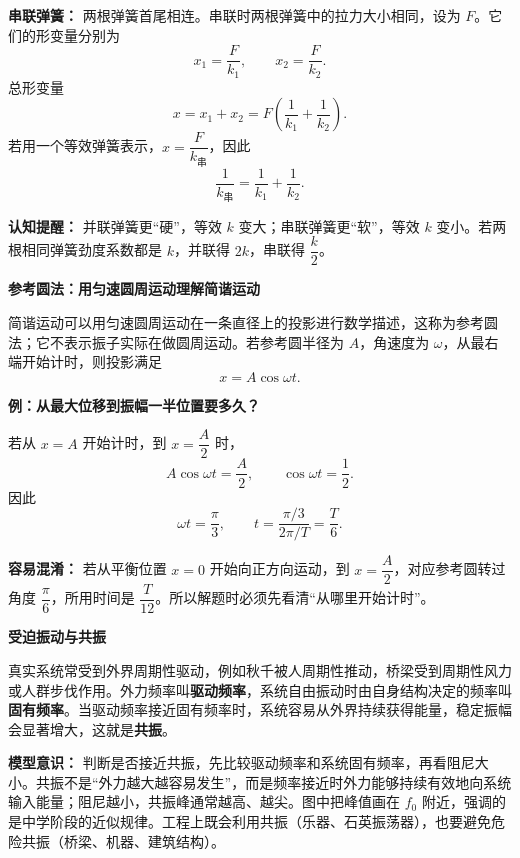 \begin{competitionbox}
\textbf{串联弹簧：} 两根弹簧首尾相连。串联时两根弹簧中的拉力大小相同，设为 $F$。它们的形变量分别为
\[
x_1=\frac{F}{k_1},\qquad x_2=\frac{F}{k_2}.
\]
总形变量
\[
x=x_1+x_2=F\left(\frac1{k_1}+\frac1{k_2}\right).
\]
若用一个等效弹簧表示，$x=\dfrac{F}{k_{\text{串}}}$，因此
\[
\frac1{k_{\text{串}}}=\frac1{k_1}+\frac1{k_2}.
\]

\textbf{认知提醒：} 并联弹簧更“硬”，等效 $k$ 变大；串联弹簧更“软”，等效 $k$ 变小。若两根相同弹簧劲度系数都是 $k$，并联得 $2k$，串联得 $\dfrac{k}{2}$。

\medskip
\textbf{参考圆法：用匀速圆周运动理解简谐运动}

简谐运动可以用匀速圆周运动在一条直径上的投影进行数学描述，这称为参考圆法；它不表示振子实际在做圆周运动。若参考圆半径为 $A$，角速度为 $\omega$，从最右端开始计时，则投影满足
\[
x=A\cos\omega t.
\]

\begin{center}


\label{fig:reference-circle-shm}
\end{center}

\textbf{例：从最大位移到振幅一半位置要多久？}

若从 $x=A$ 开始计时，到 $x=\dfrac{A}{2}$ 时，
\[
A\cos\omega t=\frac{A}{2},\qquad \cos\omega t=\frac12.
\]
因此
\[
\omega t=\frac{\pi}{3},\qquad
t=\frac{\pi/3}{2\pi/T}=\frac{T}{6}.
\]

\textbf{容易混淆：} 若从平衡位置 $x=0$ 开始向正方向运动，到 $x=\dfrac{A}{2}$，对应参考圆转过角度 $\dfrac{\pi}{6}$，所用时间是 $\dfrac{T}{12}$。所以解题时必须先看清“从哪里开始计时”。

\medskip
\textbf{受迫振动与共振}

真实系统常受到外界周期性驱动，例如秋千被人周期性推动，桥梁受到周期性风力或人群步伐作用。外力频率叫\textbf{驱动频率}，系统自由振动时由自身结构决定的频率叫\textbf{固有频率}。当驱动频率接近固有频率时，系统容易从外界持续获得能量，稳定振幅会显著增大，这就是\textbf{共振}。

\begin{center}


\label{fig:resonance-curve}
\end{center}

\textbf{模型意识：} 判断是否接近共振，先比较驱动频率和系统固有频率，再看阻尼大小。共振不是“外力越大越容易发生”，而是频率接近时外力能够持续有效地向系统输入能量；阻尼越小，共振峰通常越高、越尖。图中把峰值画在 $f_0$ 附近，强调的是中学阶段的近似规律。工程上既会利用共振（乐器、石英振荡器），也要避免危险共振（桥梁、机器、建筑结构）。
\end{competitionbox}

